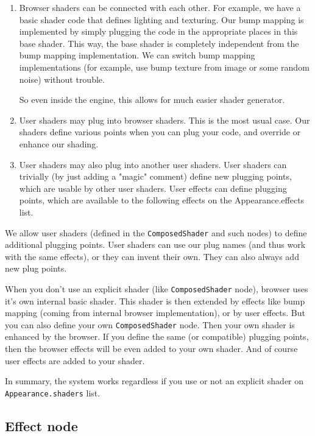 \documentclass{acmsiggraph}                     %
\newenvironment{myenumerate}
{\begin{enumerate}
  \setlength{\itemsep}{0pt}
  \setlength{\parskip}{0pt}
  \setlength{\parsep}{0pt}}
{\end{enumerate}}
\begin{document}
\begin{myenumerate}
\itemsep 0pt
\item Browser shaders can be connected with each other. For example, we
have a basic shader code that defines lighting and texturing. Our bump
mapping is implemented by simply plugging the code in the appropriate
places in this base shader. This way, the base shader is completely
independent from the bump mapping implementation. We can switch bump
mapping implementations (for example, use bump texture from image or
some random noise) without trouble.

So even inside the engine, this allows for much easier shader generator.

\item User shaders may plug into browser shaders. This is the most usual
case. Our shaders define various points when you can plug your code,
and override or enhance our shading.

\item User shaders may also plug into another user shaders. User shaders
can trivially (by just adding a "magic" comment) define new plugging
points, which are usable by other user shaders. User effects can
define plugging points, which are available to the following effects
on the Appearance.effects list.

\end{myenumerate}

We allow user shaders (defined in the \texttt{ComposedShader} and such nodes) to
define additional plugging points. User shaders can use our plug names
(and thus work with the same effects), or they can invent their
own. They can also always add new plug points.

When you don't use an explicit shader (like \texttt{ComposedShader} node),
browser uses it's own internal basic shader. This shader is then
extended by effects like bump mapping (coming from internal browser
implementation), or by user effects. But you can also define your own
\texttt{ComposedShader} node. Then your own shader is enhanced by the
browser. If you define the same (or compatible) plugging
points, then the browser effects will be even added to your own
shader. And of course user effects are added to your shader.

In summary, the system works regardless if you use or not an explicit
shader on \texttt{Appearance.shaders} list.

\subsection{Effect node}
\end{document}
